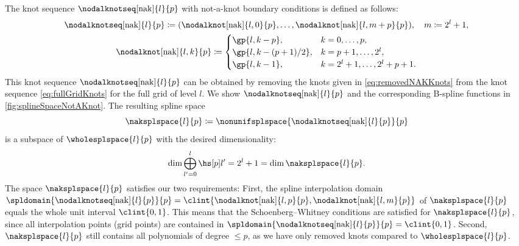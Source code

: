 The knot sequence $\nodalknotseq[\nak]{l}{p}$
with not-a-knot boundary conditions is defined as follows:
\begin{subequations}
  \begin{gather}
    \nodalknotseq[\nak]{l}{p}
    \ceq (\nodalknot[\nak]{l,0}{p}, \dotsc,
    \nodalknot[\nak]{l,m+p}{p}),\quad
    m \ceq 2^l + 1,\\
    \nodalknot[\nak]{l,k}{p}
    \ceq
    \begin{cases}
      \gp{l,k-p},&
      k = 0, \dotsc, p,\\
      \gp{l,k-(p+1)/2},&
      k = p + 1, \dotsc, 2^l,\\
      \gp{l,k-1},&
      k = 2^l + 1, \dotsc, 2^l + p + 1.
    \end{cases}
  \end{gather}
\end{subequations}
This knot sequence $\nodalknotseq[\nak]{l}{p}$
can be obtained by removing the knots
given in \eqref{eq:removedNAKKnots} from the
knot sequence \eqref{eq:fullGridKnots} for the full grid of level $l$.
We show $\nodalknotseq[\nak]{l}{p}$ and the corresponding B-spline functions
in \cref{fig:splineSpaceNotAKnot}.
The resulting spline space
\begin{equation}
  \naksplspace{l}{p}
  \ceq \nonunifsplspace{\nodalknotseq[\nak]{l}{p}}{p}
\end{equation}
is a subspace
of $\wholesplspace{l}{p}$ with the desired dimensionality:
\begin{equation}
  \dim \bigoplus_{l'=0}^l \hsbspl{l'}{p}
  = 2^l + 1
  = \dim \naksplspace{l}{p}.
\end{equation}
The space $\naksplspace{l}{p}$ satisfies our two requirements:
\vspace{0.1em}%
First, the spline interpolation domain
$\spldomain{\nodalknotseq[\nak]{l}{p}}{p}
= \clint{\nodalknot[\nak]{l,p}{p}, \nodalknot[\nak]{l,m}{p}}$
of $\naksplspace{l}{p}$ equals the whole unit interval $\clint{0, 1}$.
\vspace{-0.3em}%
This means that the Schoenberg--Whitney conditions are satisfied
\vspace{0.1em}%
for $\naksplspace{l}{p}$, since all interpolation points
(grid points) are contained in
$\spldomain{\nodalknotseq[\nak]{l}{p}}{p} = \clint{0, 1}$.
\vspace{-0.3em}%
Second, $\naksplspace{l}{p}$ still contains all polynomials of
degree $\le p$, as we have only removed knots compared to
$\wholesplspace{l}{p}$.

